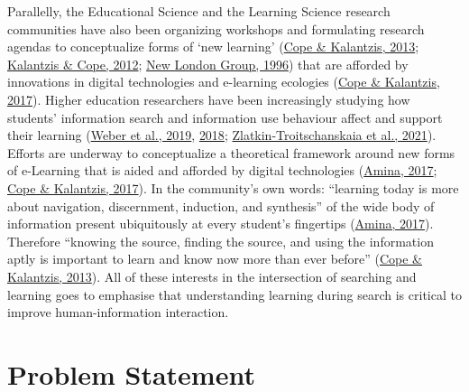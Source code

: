\documentclass[a4paper, nobind]{templates/ociamthesis}
\begin{document}
Parallelly, the Educational Science and the Learning Science research
communities have also been organizing workshops and formulating research
agendas to conceptualize forms of `new learning'
(\protect\hyperlink{ref-cope2013new}{Cope \& Kalantzis, 2013}; \protect\hyperlink{ref-kalantzis2012newa}{Kalantzis \& Cope, 2012}; \protect\hyperlink{ref-newlondon1996pedagogy}{New London Group, 1996}) that are
afforded by innovations in digital technologies and e-learning ecologies
(\protect\hyperlink{ref-cope2017elearningc}{Cope \& Kalantzis, 2017}). Higher education researchers have been
increasingly studying how students' information search and information
use behaviour affect and support their learning
(\protect\hyperlink{ref-weber2019informationseeking}{Weber et al., 2019}, \protect\hyperlink{ref-weber2018can}{2018}; \protect\hyperlink{ref-zlatkin2021students}{Zlatkin-Troitschanskaia et al., 2021}).
Efforts are underway to conceptualize a theoretical framework around new
forms of e-Learning that is aided and afforded by digital technologies
(\protect\hyperlink{ref-amina2017active}{Amina, 2017}; \protect\hyperlink{ref-cope2017elearningc}{Cope \& Kalantzis, 2017}). In the community's own words:
``learning today is more about navigation, discernment, induction, and
synthesis'' of the wide body of information present ubiquitously at every
student's fingertips (\protect\hyperlink{ref-amina2017active}{Amina, 2017}). Therefore ``knowing the source,
finding the source, and using the information aptly is important to
learn and know now more than ever before'' (\protect\hyperlink{ref-cope2013new}{Cope \& Kalantzis, 2013}). All of these
interests in the intersection of searching and learning goes to
emphasise that understanding learning during search is critical to
improve human-information interaction.

\hypertarget{sec:intro_problem_statement}{%
\section{Problem Statement}\label{sec:intro_problem_statement}}
\end{document}
